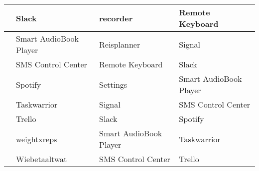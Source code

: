 \begin{table}[]
\begin{tabular}{|l|l|l|l|}
                                                                            & Slack                                                                            & recorder                                                                    & Remote Keyboard                                                                 \\ \hline
                                                                            & Smart AudioBook Player                                                           & Reisplanner                                                                 & Signal                                                                          \\ \hline
                                                                            & SMS Control Center                                                               & Remote Keyboard                                                             & Slack                                                                           \\ \hline
                                                                            & Spotify                                                                          & Settings                                                                    & Smart AudioBook Player                                                          \\ \hline
                                                                            & Taskwarrior                                                                      & Signal                                                                      & SMS Control Center                                                              \\ \hline
                                                                            & Trello                                                                           & Slack                                                                       & Spotify                                                                         \\ \hline
                                                                            & weightxreps                                                                      & Smart AudioBook Player                                                      & Taskwarrior                                                                     \\ \hline
                                                                            & Wiebetaaltwat                                                                    & SMS Control Center                                                          & Trello                                                                          \\ \hline

\end{tabular}
\end{table}
